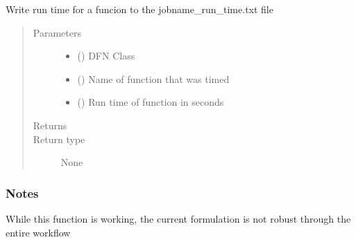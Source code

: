 \documentclass[letterpaper,10pt,english]{sphinxmanual}
\begin{document}
\begin{fulllineitems}
\begin{fulllineitems}
\end{fulllineitems}


\begin{fulllineitems}
\label{\detokenize{pydfnworks:pydfnworks.general.dfnworks.DFNWORKS.dump_time}}
Write run time for a funcion to the jobname\_run\_time.txt file
\begin{quote}\begin{description}
\item[{Parameters}] \leavevmode\begin{itemize}
\item {} 
 () \textendash{} DFN Class

\item {} 
 () \textendash{} Name of function that was timed

\item {} 
 () \textendash{} Run time of function in seconds

\end{itemize}

\item[{Returns}] \leavevmode


\item[{Return type}] \leavevmode
None

\end{description}\end{quote}
\subsubsection*{Notes}

While this function is working, the current formulation is not robust through the entire workflow

\end{fulllineitems}



\end{fulllineitems}
\end{document}
